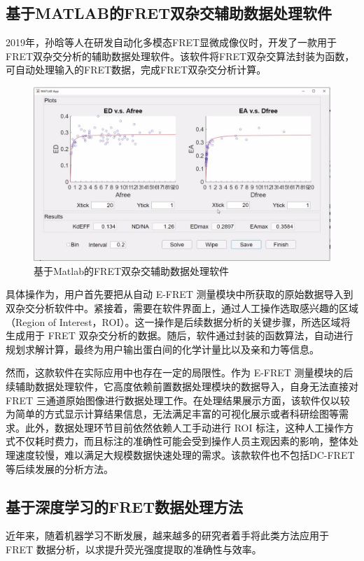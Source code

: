 \subsection{基于MATLAB的FRET双杂交辅助数据处理软件}

\ifshowtext

2019年，孙晗等人在研发自动化多模态FRET显微成像仪时，开发了一款用于FRET双杂交分析的辅助数据处理软件。该软件将FRET双杂交算法封装为函数，可自动处理输入的FRET数据，完成FRET双杂交分析计算。

\begin{figure}[htbp]
    \centering
    \includegraphics[width=0.5\linewidth]{../figures/1/1_matlab双杂交.jpg}
    \caption{基于Matlab的FRET双杂交辅助数据处理软件}
    \label{fig:matlab}
\end{figure}

具体操作为，用户首先要把从自动 E-FRET 测量模块中所获取的原始数据导入到双杂交分析软件中。紧接着，需要在软件界面上，通过人工操作选取感兴趣的区域（Region of Interest，ROI）。这一操作是后续数据分析的关键步骤，所选区域将生成用于 FRET 双杂交分析的数据。随后，软件通过封装的函数算法，自动进行规划求解计算，最终为用户输出蛋白间的化学计量比以及亲和力等信息。

然而，这款软件在实际应用中也存在一定的局限性。作为 E-FRET 测量模块的后续辅助数据处理软件，它高度依赖前置数据处理模块的数据导入，自身无法直接对 FRET 三通道原始图像进行数据处理工作。在处理结果展示方面，该软件仅以较为简单的方式显示计算结果信息，无法满足丰富的可视化展示或者科研绘图等需求。此外，数据处理环节目前依然依赖人工手动进行 ROI 标注，这种人工操作方式不仅耗时费力，而且标注的准确性可能会受到操作人员主观因素的影响，整体处理速度较慢，难以满足大规模数据快速处理的需求。该款软件也不包括DC-FRET等后续发展的分析方法。
\fi

\subsection{基于深度学习的FRET数据处理方法}

\ifshowtext
近年来，随着机器学习不断发展，越来越多的研究者着手将此类方法应用于 FRET 数据分析，以求提升荧光强度提取的准确性与效率。

